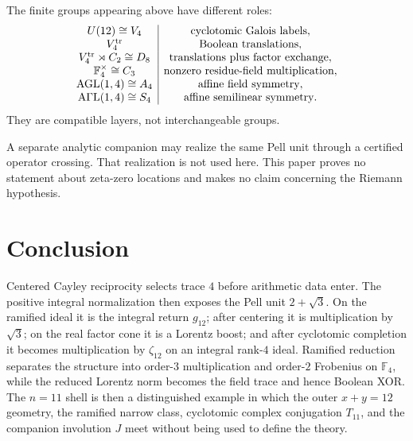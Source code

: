 \documentclass[11pt]{article}
\theoremstyle{remark}
\newcommand{\F}{\mathbb F}
\begin{document}
The finite groups appearing above have different roles:
\[
\begin{array}{c|c}
U(12)\cong V_4 & \text{cyclotomic Galois labels},\\
V_4^{\rm tr} & \text{Boolean translations},\\
V_4^{\rm tr}\rtimes C_2\cong D_8 & \text{translations plus factor exchange},\\
\F_4^\times\cong C_3 & \text{nonzero residue-field multiplication},\\
\operatorname{AGL}(1,4)\cong A_4 & \text{affine field symmetry},\\
\operatorname{A\Gamma L}(1,4)\cong S_4 & \text{affine semilinear symmetry}.
\end{array}
\]
They are compatible layers, not interchangeable groups.

A separate analytic companion may realize the same Pell unit through a
certified operator crossing.  That realization is not used here.  This paper
proves no statement about zeta-zero locations and makes no claim concerning
the Riemann hypothesis.

\section{Conclusion}

Centered Cayley reciprocity selects trace $4$ before arithmetic data enter.
The positive integral normalization then exposes the Pell unit $2+\sqrt3$.
On the ramified ideal it is the integral return $g_{12}$; after centering it
is multiplication by $\sqrt3$; on the real factor cone it is a Lorentz boost;
and after cyclotomic completion it becomes multiplication by $\zeta_{12}$ on
an integral rank-$4$ ideal.  Ramified reduction separates the structure into
order-$3$ multiplication and order-$2$ Frobenius on $\F_4$, while the reduced
Lorentz norm becomes the field trace and hence Boolean XOR.  The $n=11$
shell is then a distinguished example in which the outer $x+y=12$ geometry,
the ramified narrow class, cyclotomic complex conjugation $T_{11}$, and the
companion involution $J$ meet without being used to define the theory.
\end{document}
